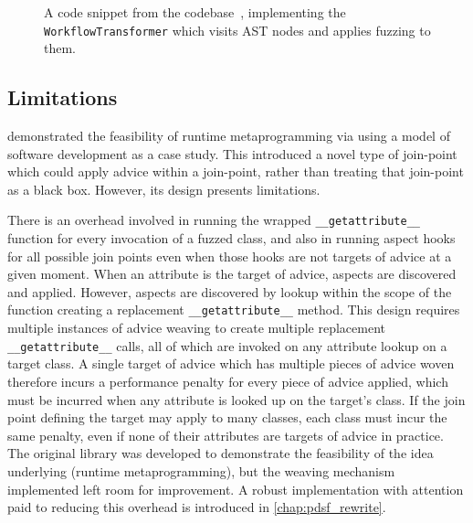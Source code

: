 \begin{figure}
    \centering
    
    \caption{A code snippet from the \pydysofu codebase~\cite{pdsf_repo}, implementing
    the \lstinline{WorkflowTransformer} which visits AST nodes and applies
    fuzzing to them.}
    \label{fig:workflowtransformer_implementation}
\end{figure}


\subsection{Limitations}\label{subsec:prior_work_pdsf_limitations}

\pydysofu demonstrated the feasibility of runtime metaprogramming via \aop{}
using a model of software development as a case study. This introduced a novel
type of join-point which could apply advice within a join-point, rather than
treating that join-point as a black box. However, its design presents
limitations.

There is an overhead involved in running the wrapped
\lstinline{__getattribute__} function for every invocation of a fuzzed class,
and also in running aspect hooks for all possible join points even when those
hooks are not targets of advice at a given moment. When an attribute is the
target of advice, aspects are discovered and applied. However, aspects are
discovered by lookup within the scope of the function creating a replacement
\lstinline{__getattribute__} method. This design requires multiple instances
of advice weaving to create multiple replacement \lstinline{__getattribute__}
calls, all of which are invoked on any attribute lookup on a target class. A single target of
advice which has multiple pieces of advice woven therefore incurs a performance
penalty for every piece of advice applied, which must be incurred when any
attribute is looked up on the target's class. If the join point defining the
target may apply to many classes, each class must incur the same penalty, even
if none of their attributes are targets of advice in practice. The original
library was developed to demonstrate the feasibility of the idea underlying
\pydysofu{} (runtime metaprogramming), but the weaving mechanism implemented left
room for improvement. A robust implementation with attention paid to reducing
this overhead is introduced in \cref{chap:pdsf_rewrite}.

